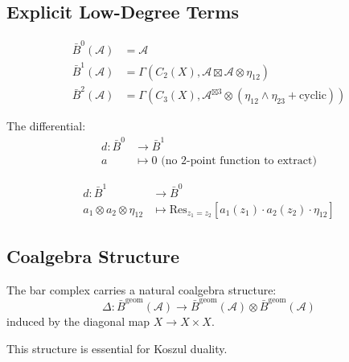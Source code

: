 \subsection{Explicit Low-Degree Terms}

\begin{example}
\begin{align}
\bar{B}^0(\mathcal{A}) &= \mathcal{A} \\
\bar{B}^1(\mathcal{A}) &= \Gamma(C_2(X), \mathcal{A} \boxtimes \mathcal{A} \otimes \eta_{12}) \\
\bar{B}^2(\mathcal{A}) &= \Gamma(C_3(X), \mathcal{A}^{\boxtimes 3} \otimes (\eta_{12} \wedge \eta_{23} + \text{cyclic}))
\end{align}

The differential:
\begin{align}
d: \bar{B}^0 &\to \bar{B}^1 \\
a &\mapsto 0 \text{ (no 2-point function to extract)}
\end{align}

\begin{align}
d: \bar{B}^1 &\to \bar{B}^0 \\
a_1 \otimes a_2 \otimes \eta_{12} &\mapsto \text{Res}_{z_1=z_2}[a_1(z_1) \cdot a_2(z_2) \cdot \eta_{12}]
\end{align}
\end{example}

\subsection{Coalgebra Structure}

\begin{theorem}
The bar complex carries a natural coalgebra structure:
$$\Delta: \bar{B}^{\text{geom}}(\mathcal{A}) \to \bar{B}^{\text{geom}}(\mathcal{A}) \otimes \bar{B}^{\text{geom}}(\mathcal{A})$$
induced by the diagonal map $X \to X \times X$.
\end{theorem}

This structure is essential for Koszul duality.

